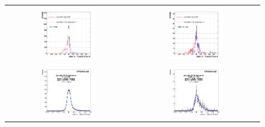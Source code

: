 \begin{figure}[bh]
  \begin{center}
    \begin{tabular}{cc}
      \includegraphics[width=0.45\textwidth]{chapters/Zprime/Saturation/images/FlatPt/ZToEE_check/4500_6000/compare_BDTG_Barrel_Endcap_enSC_B_s.png} &
      \includegraphics[width=0.45\textwidth]{chapters/Zprime/Saturation/images/FlatPt/ZToEE_check/4500_6000/compare_BDTG_Barrel_Endcap_enSC_E_s.png} \\
      \includegraphics[width=0.45\textwidth]{chapters/Zprime/Saturation/images/FlatPt/ZToEE_check/4500_6000/fit_BDTG_Barrel_Endcap_B_reg_s.png} &
      \includegraphics[width=0.45\textwidth]{chapters/Zprime/Saturation/images/FlatPt/ZToEE_check/4500_6000/fit_BDTG_Barrel_Endcap_E_reg_s.png}

\end{tabular}
\end{center}
\end{figure}
